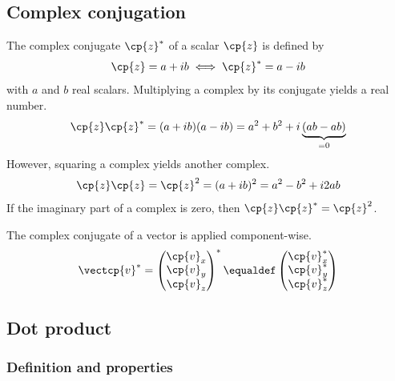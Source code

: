 \begin{refsection}

\subsection{Complex conjugation}
The complex conjugate $\cp{z}^*$ of a scalar $\cp{z}$ is defined by
\begin{equation}
    \cp{z} = a + ib \iff \cp{z}^* = a - ib
\end{equation}
with $a$ and $b$ real scalars.
Multiplying a complex by its conjugate yields a real number.
\begin{align}
    \cp{z}\cp{z}^* = (a + ib)(a - ib) = a^2 + b^2 + i\underbrace{(ab-ab)}_{=0}
\end{align}
However, squaring a complex yields another complex.
\begin{align}
    \cp{z}\cp{z} = \cp{z}^2 = (a + ib)^2 = a^2 - b^2 + i2ab
\end{align}
If the imaginary part of a complex is zero, then $\cp{z}\cp{z}^* = \cp{z}^2$.

The complex conjugate of a vector is applied component-wise.
\begin{equation}
    \vectcp{v}^*
    =
    \begin{pmatrix}
        \cp{v}_x \\ \cp{v}_y \\ \cp{v}_z
    \end{pmatrix}^*
    \equaldef
    \begin{pmatrix}
        \cp{v}_x^* \\ \cp{v}_y^* \\ \cp{v}_z^*
    \end{pmatrix}
\end{equation}







\subsection{Dot product}

\subsubsection{Definition and properties}


\end{refsection}
